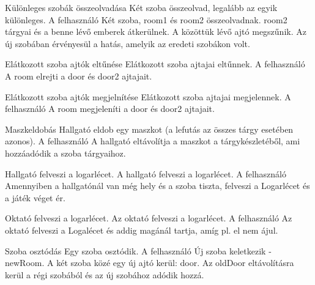 \begin{use-case}
    {Különleges szobák összeolvadása}
    {Két szoba összeolvad, legalább az egyik különleges.}
    {A felhasználó}
    Két szoba, room1 és room2 összeolvadnak. room2 tárgyai és a benne lévő emberek átkerülnek. A közöttük lévő ajtó megszűnik. Az új szobában érvényesül a hatás, amelyik az eredeti szobákon volt.
\end{use-case}

\begin{use-case}
    {Elátkozott szoba ajtók eltűnése}
    {Elátkozott szoba ajtajai eltűnnek.}
    {A felhasználó}
    A room elrejti a door és door2 ajtajait.
\end{use-case}

\begin{use-case}
    {Elátkozott szoba ajtók megjelnítése}
    {Elátkozott szoba ajtajai megjelennek.}
    {A felhasználó}
    A room megjeleníti a door és door2 ajtajait.
\end{use-case}

\begin{use-case}
    {Maszkeldobás}
    {Hallgató eldob egy maszkot (a lefutás az összes tárgy esetében azonos).}
    {A felhasználó}
    A hallgató eltávolítja a maszkot a tárgykészletéből, ami hozzáadódik a szoba tárgyaihoz.
\end{use-case}

\begin{use-case}
    {Hallgató felveszi a logarlécet.}
    {A hallgató felveszi a logarlécet.}
    {A felhasználó}
    Amennyiben a hallgatónál van még hely és a szoba tiszta, felveszi a Logarlécet és a játék véget ér.
\end{use-case}

\begin{use-case}
    {Oktató felveszi a logarlécet.}
    {Az oktató felveszi a logarlécet.}
    {A felhasználó}
    Az oktató felveszi a Logalécet és addig magánál tartja, amíg pl. el nem ájul.
\end{use-case}

\begin{use-case}
    {Szoba osztódás}
    {Egy szoba osztódik.}
    {A felhasználó}
   Új szoba keletkezik - newRoom. A két szoba közé egy új ajtó kerül: door. Az oldDoor eltávolításra kerül a régi szobából és az új szobához adódik hozzá. 
\end{use-case}

